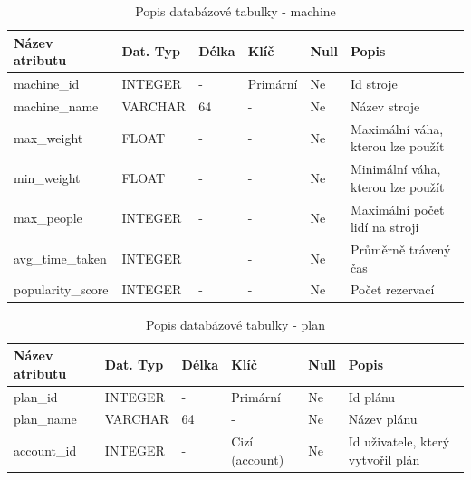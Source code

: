\begin{table}[h!]
	\caption{Popis databázové tabulky - machine}
    \label{tab:dat-dictionary-machine}
	\begin{tabular}{|p{3.5cm}|p{2cm}|p{1cm}|p{2.5cm}|p{.75cm}|p{3.75cm}|}
		\hline
        \textbf{Název atributu} & \textbf{Dat. Typ} & \textbf{Délka} & \textbf{Klíč} & \textbf{Null} & \textbf{Popis} \\
        \hline
            machine\_id & INTEGER   &  -    & Primární       & Ne & Id stroje \\
            \hline
            machine\_name     & VARCHAR   &  64   & -                 & Ne & Název stroje \\
            \hline
            max\_weight       & FLOAT   &  -   & -                 & Ne &  Maximální váha, kterou lze použít \\
            \hline
            min\_weight       & FLOAT   &  -    & -                 & Ne &  Minimální váha, kterou lze použít \\
            \hline
            max\_people       & INTEGER   &  -  & -                 & Ne & Maximální počet lidí na stroji \\
            \hline
            avg\_time\_taken    & INTEGER   &     & -                 & Ne & Průměrně trávený čas \\
            \hline
            popularity\_score & INTEGER      &  -    & -                 & Ne &  Počet rezervací \\
        \hline
	\end{tabular}
\end{table}

\begin{table}[h!]
	\caption{Popis databázové tabulky - plan}
    \label{tab:dat-dictionary-plan}
	\begin{tabular}{|p{3.5cm}|p{2cm}|p{1cm}|p{2.5cm}|p{.75cm}|p{3.75cm}|}
		\hline
        \textbf{Název atributu} & \textbf{Dat. Typ} & \textbf{Délka} & \textbf{Klíč} & \textbf{Null} & \textbf{Popis} \\
        \hline
            plan\_id & INTEGER   &  -    & Primární       & Ne & Id plánu \\
        \hline
            plan\_name     & VARCHAR   &  64   & -                 & Ne & Název plánu \\
        \hline
            account\_id     & INTEGER   &  -   & Cizí (account)                 & Ne & Id uživatele, který vytvořil plán \\
        \hline
	\end{tabular}
\end{table}

